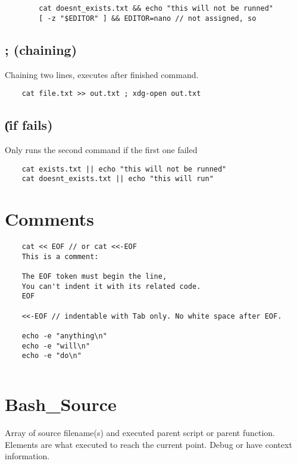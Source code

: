 \begin{verbatim}
        cat doesnt_exists.txt && echo "this will not be runned" 
        [ -z "$EDITOR" ] && EDITOR=nano // not assigned, so
\end{verbatim}

    \subsection{; (chaining)}
    Chaining two lines, executes after finished command.
    
    \begin{verbatim}
    cat file.txt >> out.txt ; xdg-open out.txt 
    \end{verbatim}

    \subsection{\|\| (if fails)}
    Only runs the second command if the first one failed

\begin{verbatim}
    cat exists.txt || echo "this will not be runned" 
    cat doesnt_exists.txt || echo "this will run" 
\end{verbatim}

\section{Comments}

\begin{verbatim}
    cat << EOF // or cat <<-EOF
    This is a comment:

    The EOF token must begin the line,
    You can't indent it with its related code. 
    EOF

    <<-EOF // indentable with Tab only. No white space after EOF.

    echo -e "anything\n"
    echo -e "will\n"
    echo -e "do\n"
\end{verbatim}
    
    \begin{verbatim}
    \end{verbatim}
    
\section{Bash\_Source}

    Array of source filename(s) and executed parent script or parent function.
    Elements are what executed to reach the current point.
    Debug or have context information.

